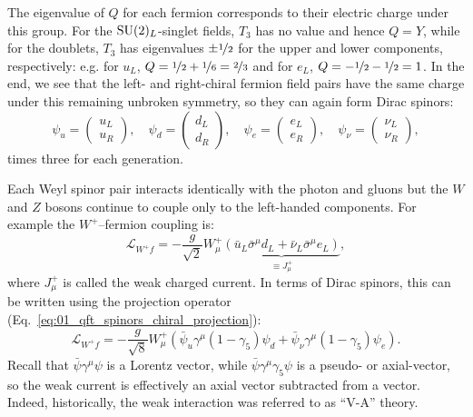 The eigenvalue of $Q$ for each fermion corresponds to their electric charge under this group.
For the $\SU[2]_L$-singlet fields, $T_3$ has no value and hence $Q = Y$, while for the doublets, $T_3$ has eigenvalues $\pm \cnicefrac{1}{2}$ for the upper and lower components, respectively: e.g. for $u_L$, $Q = \cnicefrac{1}{2} + \cnicefrac{1}{6} = \cnicefrac{2}{3}$ and for $e_L$, $Q = -\cnicefrac{1}{2}-\cnicefrac{1}{2} = 1$.
In the end, we see that the left- and right-chiral fermion field pairs have the same charge under this remaining unbroken symmetry, so they can again form Dirac spinors:
\begin{equation}
	\label{eq:01_sm_ew_dirac}
	\psi_u = \begin{pmatrix} u_L \\ u_R \end{pmatrix}, \quad \psi_d = \begin{pmatrix} d_L \\ d_R \end{pmatrix}, \quad \psi_e = \begin{pmatrix} e_L \\ e_R \end{pmatrix}, \quad \psi_\nu = \begin{pmatrix} \nu_L \\ \nu_R \end{pmatrix},
\end{equation}
times three for each generation.

Each Weyl spinor pair interacts identically with the photon and gluons but the $W$ and $Z$ bosons continue to couple only to the left-handed components.
For example the $W^+$--fermion coupling is:
\begin{equation}
	\label{eq:01_sm_ew_w_coupling}
	\mathcal{L}_{W^+f} = -\frac{g}{\sqrt{2}} W^+_\mu \underbrace{\left(\bar{u}_L \bar\sigma^\mu d_L + \bar{\nu}_L \bar\sigma^\mu e_L\right)}_{\equiv J^+_\mu},
\end{equation}
where $J^+_\mu$ is called the weak charged current.
In terms of Dirac spinors, this can be written using the projection operator (Eq.~\ref{eq:01_qft_spinors_chiral_projection}):
\begin{equation}
	\label{eq:01_sm_ew_w_coupling_dirac}
	\mathcal{L}_{W^+f} = -\frac{g}{\sqrt{8}} W^+_\mu \left(\bar{\psi}_u \gamma^\mu (1 - \gamma_5) \psi_d + \bar{\psi}_\nu \gamma^\mu (1 - \gamma_5) \psi_e\right).
\end{equation}
Recall that $\bar\psi \gamma^\mu \psi$ is a Lorentz vector, while $\bar\psi \gamma^\mu \gamma_5 \psi$ is a pseudo- or axial-vector, so the weak current is effectively an axial vector subtracted from a vector.
Indeed, historically, the weak interaction was referred to as ``V-A'' theory.

